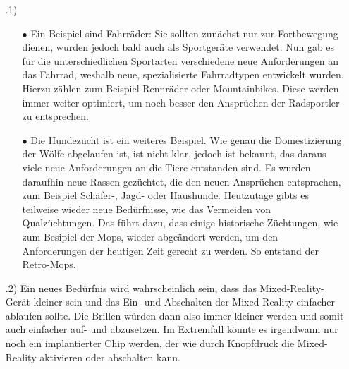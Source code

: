 \documentclass[12pt]{scrartcl}
\begin{document}
\exercise{}
\begin{itemize}
    \item[\theenumi.1)] \begin{itemize}
                            \item[$\bullet$] Ein Beispiel sind Fahrräder: Sie sollten zunächst nur zur Fortbewegung dienen, wurden jedoch bald auch als Sportgeräte verwendet. 
                                             Nun gab es für die unterschiedlichen Sportarten verschiedene neue Anforderungen an das Fahrrad, weshalb neue, spezialisierte Fahrradtypen entwickelt wurden. 
                                             Hierzu zählen zum Beispiel Rennräder oder Mountainbikes. Diese werden immer weiter optimiert, um noch besser den Ansprüchen der Radsportler zu entsprechen.
                            \item[$\bullet$] Die Hundezucht ist ein weiteres Beispiel. Wie genau die Domestizierung der Wölfe abgelaufen ist, ist nicht klar, jedoch ist bekannt,
                                             das daraus viele neue Anforderungen an die Tiere entstanden sind. Es wurden daraufhin neue Rassen gezüchtet, die den neuen Ansprüchen entsprachen,
                                             zum Beispiel Schäfer-, Jagd- oder Haushunde. Heutzutage gibts es teilweise wieder neue Bedürfnisse, wie das Vermeiden von Qualzüchtungen. Das führt dazu, dass
                                             einige historische Züchtungen, wie zum Besipiel der Mops, wieder abgeändert werden, um den Anforderungen der heutigen Zeit gerecht zu werden. So entstand der Retro-Mops.
                        \end{itemize}
    \item[\theenumi.2)] Ein neues Bedürfnis wird wahrscheinlich sein, dass das Mixed-Reality-Gerät kleiner sein und das Ein- und Abschalten der Mixed-Reality einfacher ablaufen sollte.
                        Die Brillen würden dann also immer kleiner werden und somit auch einfacher auf- und abzusetzen. Im Extremfall könnte es irgendwann nur noch ein implantierter Chip werden, der
                        wie durch Knopfdruck die Mixed-Reality aktivieren oder abschalten kann.
\end{itemize}
\end{document}
